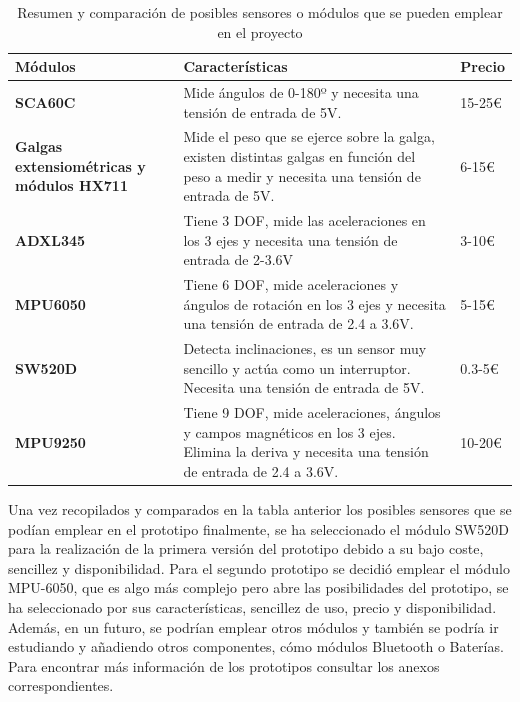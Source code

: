 \newpage


\begin{table}[h!]
\centering
\begin{tabular}{ |m{3.5cm}|m{8.5cm}|m{2cm}|  } 
\hline
\cellcolor[HTML]{B9E3F0}\textbf{Módulos} & \cellcolor[HTML]{B9E3F0}\textbf{Características} & \cellcolor[HTML]{B9E3F0}\textbf{Precio}\\

\hline
\cellcolor[HTML]{EFEFEF}\textbf{SCA60C}             & {Mide ángulos de 0-180º y necesita una tensión de entrada de 5V.}   & 15-25€\\
\hline
\cellcolor[HTML]{EFEFEF}\textbf{Galgas extensiométricas y módulos HX711}                & {Mide el peso que se ejerce sobre la galga, existen distintas galgas en función del peso a medir y necesita una tensión de entrada de 5V.} & 6-15€\\
\hline
\cellcolor[HTML]{EFEFEF}\textbf{ADXL345}                & {Tiene 3 DOF, mide las aceleraciones en los 3 ejes y necesita una tensión de entrada de 2-3.6V} & 3-10€\\
\hline
\cellcolor[HTML]{EFEFEF}\textbf{MPU6050}                & {Tiene 6 DOF, mide aceleraciones y ángulos de rotación en los 3 ejes y necesita una tensión de entrada de 2.4 a 3.6V.} & 5-15€\\
\hline
\cellcolor[HTML]{EFEFEF}\textbf{SW520D}                & {Detecta inclinaciones, es un sensor muy sencillo y actúa como un interruptor. Necesita una tensión de entrada de 5V.} & 0.3-5€\\
\hline
\cellcolor[HTML]{EFEFEF}\textbf{MPU9250}                & {Tiene 9 DOF, mide aceleraciones, ángulos y campos magnéticos en los 3 ejes. Elimina la deriva y necesita una tensión de entrada de 2.4 a 3.6V.} & 10-20€\\
\hline
\end{tabular}
\caption{Resumen y comparación de posibles sensores o módulos que se pueden emplear en el proyecto}
\end{table}


Una vez recopilados y comparados en la tabla anterior los posibles sensores que se podían emplear en el prototipo finalmente, se ha seleccionado el módulo SW520D para la realización de la primera versión del prototipo debido a su bajo coste, sencillez y disponibilidad. Para el segundo prototipo se decidió emplear el módulo MPU-6050, que es algo más complejo pero abre las posibilidades del prototipo, se ha seleccionado por sus características, sencillez de uso, precio y disponibilidad. Además, en un futuro, se podrían emplear otros módulos y también se podría ir estudiando y añadiendo otros componentes, cómo módulos Bluetooth o Baterías. Para encontrar más información de los prototipos consultar los anexos correspondientes.
